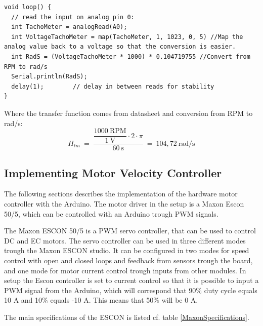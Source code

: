 \begin{lstlisting}
void loop() {
  // read the input on analog pin 0:
  int TachoMeter = analogRead(A0);
  int VoltageTachoMeter = map(TachoMeter, 1, 1023, 0, 5) //Map the analog value back to a voltage so that the conversion is easier.
  int RadS = (VoltageTachoMeter * 1000) * 0.104719755 //Convert from RPM to rad/s
  Serial.println(RadS);
  delay(1);        // delay in between reads for stability
}
\end{lstlisting}  

Where the transfer function comes from datasheet and conversion from RPM to rad/s:
\begin{equation}
H_{tm}\ =\ \dfrac{\dfrac{1000\ \text{RPM}}{1\ \text{V}} \cdot 2 \cdot \pi}{60\ \text{s}}\ =\ 104,72\ \text{rad/s}
\end{equation}

\subsection{Implementing Motor Velocity Controller}
The following sections describes the implementation of the hardware motor controller with the Arduino. The motor driver in the setup is a Maxon Escon 50/5, which can be controlled with an Arduino trough PWM signals. 

The Maxon ESCON 50/5 is a PWM servo controller, that can be used to control DC and EC motors. The servo controller can be used in three different modes trough the Maxon ESCON studio. It can be configured in two modes for speed control with open and closed loops and feedback from sensors trough the board, and one mode for motor current control trough inputs from other modules. In setup the Escon controller is set to current control so that it is possible to input a PWM signal from the Arduino, which will correspond that 90\% duty cycle equals 10 A and 10\% equals -10 A. This means that 50\% will be 0 A. 

The main specifications of the ESCON is listed cf. table \ref{MaxonSpecifications}.

